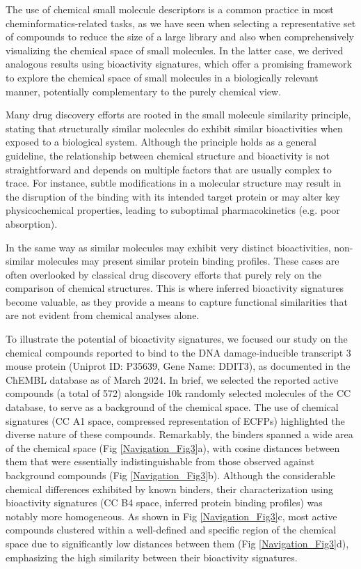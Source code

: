 The use of chemical small molecule descriptors is a common practice in most cheminformatics-related tasks, as we have seen when selecting a representative set of compounds to reduce the size of a large library and also when comprehensively visualizing the chemical space of small molecules. In the latter case, we derived analogous results using bioactivity signatures, which offer a promising framework to explore the chemical space of small molecules in a biologically relevant manner, potentially complementary to the purely chemical view. 

Many drug discovery efforts are rooted in the small molecule similarity principle, stating that structurally similar molecules do exhibit similar bioactivities when exposed to a biological system. Although the principle holds as a general guideline, the relationship between chemical structure and bioactivity is not straightforward and depends on multiple factors that are usually complex to trace. For instance, subtle modifications in a molecular structure may result in the disruption of the binding with its intended target protein or may alter key physicochemical properties, leading to suboptimal pharmacokinetics (e.g. poor absorption).

In the same way as similar molecules may exhibit very distinct bioactivities, non-similar molecules may present similar protein binding profiles. These cases are often overlooked by classical drug discovery efforts that purely rely on the comparison of chemical structures. This is where inferred bioactivity signatures become valuable, as they provide a means to capture functional similarities that are not evident from chemical analyses alone.

To illustrate the potential of bioactivity signatures, we focused our study on the chemical compounds reported to bind to the DNA damage-inducible transcript 3 mouse protein (Uniprot ID: P35639, Gene Name: DDIT3), as documented in the ChEMBL\cite{zdrazil_chembl_2024, gaulton_chembl_2017} database as of March 2024. In brief, we selected the reported active compounds (a total of 572) alongside 10k randomly selected molecules of the CC database, to serve as a background of the chemical space. The use of chemical signatures (CC A1 space, compressed representation of ECFPs) highlighted the diverse nature of these compounds. Remarkably, the binders spanned a wide area of the chemical space (Fig \ref{Navigation_Fig3}a), with cosine distances between them that were essentially indistinguishable from those observed against background compounds (Fig \ref{Navigation_Fig3}b). Although the considerable chemical differences exhibited by known binders, their characterization using bioactivity signatures (CC B4 space, inferred protein binding profiles) was notably more homogeneous. As shown in Fig \ref{Navigation_Fig3}c, most active compounds clustered within a well-defined and specific region of the chemical space due to significantly low distances between them (Fig \ref{Navigation_Fig3}d), emphasizing the high similarity between their bioactivity signatures. 

